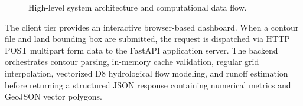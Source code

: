 \documentclass[manuscript,screen]{acmart}
\begin{document}
\begin{figure}[h]
  \centering
  \caption{High-level system architecture and computational data flow.}
  \label{fig:architecture}
\end{figure}

The client tier provides an interactive browser-based dashboard. When a contour file and land bounding box are submitted, the request is dispatched via HTTP POST multipart form data to the FastAPI application server. The backend orchestrates contour parsing, in-memory cache validation, regular grid interpolation, vectorized D8 hydrological flow modeling, and runoff estimation before returning a structured JSON response containing numerical metrics and GeoJSON vector polygons.
\end{document}
